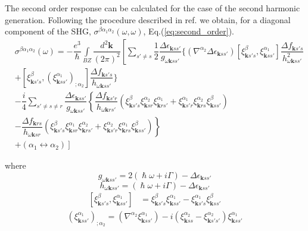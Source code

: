 \documentclass[a4paper,12pt]{report}
\begin{document}
The second order response can be calculated for the case of the second harmonic generation.
Following the procedure described in ref. \cite{Ventura2017}
we obtain, for a diagonal component of the SHG, $\sigma^{\beta\alpha_1\alpha_2}(\omega,\omega)$, Eq.(\ref{eq:second_order}).
\begin{align}\label{eq:second_order}
 &\sigma^{\beta\alpha_1\alpha_2}(\omega) = -\dfrac{e^3}{\hslash}\int\limits_{BZ}\dfrac{d^2\pmb{k}}{(2\pi)^2}
 \left[
 \sum_{s'\ne s}\dfrac{1}{2} \dfrac{\Delta\epsilon_{\pmb{k}ss'} }{ g_{\omega\pmb{k}ss'}}
 \bigg\lbrace
 \left(\nabla^{\alpha_2} \Delta \epsilon_{\pmb{k}ss'} \right)
 \left[ \xi_{\pmb{k}s's}^{\beta},\xi_{\pmb{k}ss'}^{\alpha_1}\right]
 \dfrac{\Delta f_{\pmb{k}s's}}{  h_{\omega\pmb{k}ss'}^2 }
 \right.
 \\ \nonumber
 &{}\left.
 + \left[ \xi_{\pmb{k}s's}^{\beta},(\xi_{\pmb{k}ss'}^{\alpha_1})_{;\alpha_2}\right]
 \dfrac{\Delta f_{\pmb{k}s's}}{  h_{\omega\pmb{k}ss'} }
 \bigg\rbrace
 \right.
 \\ \nonumber
 &-%
 \dfrac{i}{4}\sum_{s'\ne s \ne r}
 \dfrac{\Delta \epsilon_{\pmb{k}ss'} }{ g_{\omega\pmb{k}ss'} }
 \left\lbrace
   \dfrac{\Delta f_{\pmb{k}s'r}}{  h_{\omega\pmb{k}rs'} }
 \left( \xi_{\pmb{k}s's}^{\beta} \xi_{\pmb{k}sr}^{\alpha_2} \xi_{\pmb{k}rs'}^{\alpha_1}
     +  \xi_{\pmb{k}s'r}^{\alpha_1} \xi_{\pmb{k}rs}^{\alpha_2} \xi_{\pmb{k}ss'}^{\beta}\right)
 \right.
 \\ \nonumber
 &{}\left.
 - \dfrac{\Delta f_{\pmb{k}rs }}{  h_{\omega\pmb{k}sr } }
 \left( \xi_{\pmb{k}s's}^{\beta} \xi_{\pmb{k}sr}^{\alpha_1} \xi_{\pmb{k}rs'}^{\alpha_2}
     +  \xi_{\pmb{k}s'r}^{\alpha_2} \xi_{\pmb{k}rs}^{\alpha_1} \xi_{\pmb{k}ss'}^{\beta}\right)
 \right\rbrace \\ \nonumber
 &\left. + \left( \alpha_1 \leftrightarrow \alpha_2\right)
 \right]
\end{align}

where
\begin{equation}
 g_{\omega\pmb{k}ss'} = 2(\hslash\omega + i\Gamma) - \Delta\epsilon_{\pmb{k}ss'}
\end{equation}
\begin{equation}
 h_{\omega\pmb{k}ss'} = (\hslash\omega + i\Gamma) - \Delta\epsilon_{\pmb{k}ss'}
\end{equation}
\begin{align}
  \left[ \xi_{\pmb{k}s's}^{\beta},\xi_{\pmb{k}ss'}^{\alpha_1}\right] &=
  \xi_{\pmb{k}s's}^{\beta}\xi_{\pmb{k}ss'}^{\alpha_1} - \xi_{\pmb{k}s's}^{\alpha_1}\xi_{\pmb{k}ss'}^{\beta}
\end{align}
\begin{align}
 (\xi_{\pmb{k}ss'}^{\alpha_1})_{;\alpha_2}=
  \left( \nabla^{\alpha_2} \xi_{\pmb{k}ss'}^{\alpha_1}  \right) - i\left( \xi_{\pmb{k}ss}^{\alpha_2} - \xi_{\pmb{k}s's'}^{\alpha_2}\right) \xi_{\pmb{k}ss'}^{\alpha_1}
\end{align}
\end{document}
